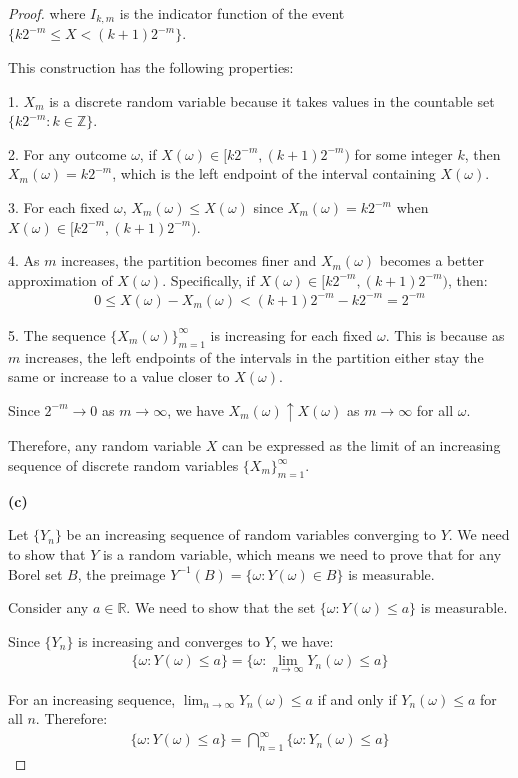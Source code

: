 \documentclass[letterpaper, 11pt]{article}
\newcommand{\1}{\mathds{1}}	%
\theoremstyle{definition}
\begin{document}
\begin{proof}
where $I_{k,m}$ is the indicator function of the event $\{k2^{-m} \leq X < (k+1)2^{-m}\}$.

This construction has the following properties:

1. $X_m$ is a discrete random variable because it takes values in the countable set $\{k2^{-m}: k \in \mathbb{Z}\}$.

2. For any outcome $\omega$, if $X(\omega) \in [k2^{-m}, (k+1)2^{-m})$ for some integer $k$, then $X_m(\omega) = k2^{-m}$, which is the left endpoint of the interval containing $X(\omega)$.

3. For each fixed $\omega$, $X_m(\omega) \leq X(\omega)$ since $X_m(\omega) = k2^{-m}$ when $X(\omega) \in [k2^{-m}, (k+1)2^{-m})$.

4. As $m$ increases, the partition becomes finer and $X_m(\omega)$ becomes a better approximation of $X(\omega)$. Specifically, if $X(\omega) \in [k2^{-m}, (k+1)2^{-m})$, then:
\begin{align*}
0 \leq X(\omega) - X_m(\omega) < (k+1)2^{-m} - k2^{-m} = 2^{-m}
\end{align*}

5. The sequence $\{X_m(\omega)\}_{m=1}^{\infty}$ is increasing for each fixed $\omega$. This is because as $m$ increases, the left endpoints of the intervals in the partition either stay the same or increase to a value closer to $X(\omega)$.

Since $2^{-m} \to 0$ as $m \to \infty$, we have $X_m(\omega) \uparrow X(\omega)$ as $m \to \infty$ for all $\omega$.

Therefore, any random variable $X$ can be expressed as the limit of an increasing sequence of discrete random variables $\{X_m\}_{m=1}^{\infty}$.

\textbf{(c)}

Let $\{Y_n\}$ be an increasing sequence of random variables converging to $Y$. We need to show that $Y$ is a random variable, which means we need to prove that for any Borel set $B$, the preimage $Y^{-1}(B) = \{\omega: Y(\omega) \in B\}$ is measurable.

Consider any $a \in \mathbb{R}$. We need to show that the set $\{\omega: Y(\omega) \leq a\}$ is measurable.

Since $\{Y_n\}$ is increasing and converges to $Y$, we have:
\begin{align*}
\{\omega: Y(\omega) \leq a\} = \{\omega: \lim_{n \to \infty} Y_n(\omega) \leq a\}
\end{align*}

For an increasing sequence, $\lim_{n \to \infty} Y_n(\omega) \leq a$ if and only if $Y_n(\omega) \leq a$ for all $n$. Therefore:
\begin{align*}
\{\omega: Y(\omega) \leq a\} = \bigcap_{n=1}^{\infty} \{\omega: Y_n(\omega) \leq a\}
\end{align*}


\end{proof}
\end{document}
